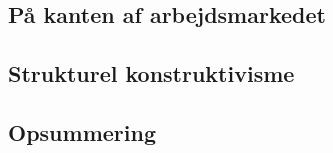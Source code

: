 \subsection{På kanten af arbejdsmarkedet}


\subsection{Strukturel konstruktivisme}


\subsection{Opsummering}


